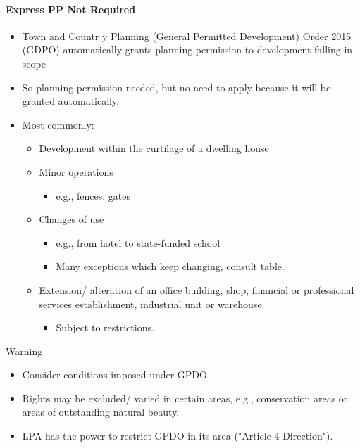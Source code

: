 \documentclass[
]{article}
\providecommand{\tightlist}{%
  \setlength{\itemsep}{0pt}\setlength{\parskip}{0pt}}
\newenvironment{env-7ede146d-a28c-46fa-985d-64c388b7528b}
{
    \savenotes\tcolorbox[blanker,breakable,left=5pt,borderline west={2pt}{-4pt}{orange}]
}
{
    \endtcolorbox\spewnotes
}
\begin{document}
\hypertarget{express-pp-not-required}{%
\paragraph{Express PP Not Required}\label{express-pp-not-required}}

\begin{itemize}
\tightlist
\item
  Town and Countr y Planning (General Permitted Development) Order 2015
  (GDPO) automatically grants planning permission to development falling
  in scope
\item
  So planning permission needed, but no need to apply because it will be
  granted automatically.
\item
  Most commonly:

  \begin{itemize}
  \tightlist
  \item
    Development within the curtilage of a dwelling house
  \item
    Minor operations

    \begin{itemize}
    \tightlist
    \item
      e.g., fences, gates
    \end{itemize}
  \item
    Changes of use

    \begin{itemize}
    \tightlist
    \item
      e.g., from hotel to state-funded school
    \item
      Many exceptions which keep changing, consult table.
    \end{itemize}
  \item
    Extension/ alteration of an office building, shop, financial or
    professional services establishment, industrial unit or warehouse.

    \begin{itemize}
    \tightlist
    \item
      Subject to restrictions.
    \end{itemize}
  \end{itemize}
\end{itemize}

\begin{env-7ede146d-a28c-46fa-985d-64c388b7528b}

Warning

\begin{itemize}
\tightlist
\item
  Consider conditions imposed under GPDO
\item
  Rights may be excluded/ varied in certain areas, e.g., conservation
  areas or areas of outstanding natural beauty.
\item
  LPA has the power to restrict GPDO in its area ("Article 4
  Direction").
\end{itemize}

\end{env-7ede146d-a28c-46fa-985d-64c388b7528b}
\end{document}
